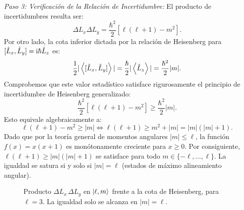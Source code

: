 \begin{ejemplobox}
    \textit{Paso 3: Verificación de la Relación de Incertidumbre:}
    El producto de incertidumbres resulta ser:
    \begin{equation}
        \Delta L_x \Delta L_y = \frac{\hbar^2}{2}[\ell(\ell+1) - m^2].
    \end{equation}
    Por otro lado, la cota inferior dictada por la relación de Heisenberg para $[\hat{L}_x, \hat{L}_y] = \mathrm{i}\hbar\hat{L}_z$ es:
    \begin{equation}
        \frac{1}{2}|\left\langle [\hat{L}_x, \hat{L}_y] \right\rangle| = \frac{\hbar}{2}|\left\langle \hat{L}_z \right\rangle| = \frac{\hbar^2}{2}|m|.
    \end{equation}
    Comprobemos que este valor estadístico satisface rigurosamente el principio de incertidumbre de Heisenberg generalizado:
    \begin{equation}
        \frac{\hbar^2}{2}[\ell(\ell+1) - m^2] \ge \frac{\hbar^2}{2}|m|.
    \end{equation}
    Esto equivale algebraicamente a:
    \begin{equation}
        \ell(\ell+1) - m^2 \ge |m| \iff \ell(\ell+1) \ge m^2 + |m| = |m|(|m|+1).
    \end{equation}
    Dado que por la teoría general de momentos angulares $|m| \le \ell$, la función $f(x) = x(x+1)$ es monótonamente creciente para $x \ge 0$. Por consiguiente, $\ell(\ell+1) \ge |m|(|m|+1)$ se satisface para todo $m \in \{-\ell, \dots, \ell\}$. La igualdad se satura si y solo si $|m| = \ell$ (estados de máximo alineamiento angular).
\end{ejemplobox}

\begin{figure}[H]
    \centering
    
    \caption{Producto $\Delta L_x\,\Delta L_y$ en $\left| \ell,m \right\rangle$ frente a la cota de Heisenberg, para $\ell=3$. La igualdad solo se alcanza en $|m|=\ell$.}
    \label{fig:incert_Lxy}
\end{figure}

